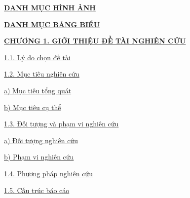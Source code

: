 \documentclass[12pt,a4paper]{article}
\begin{document}
{\small\linespread{0.84}\selectfont\setlength{\parskip}{0pt}
\noindent\hyperref[page:danh_muc_hinh]{\textbf{DANH MỤC HÌNH ẢNH} \dotfill \textbf{\pageref*{page:danh_muc_hinh}}}\par\vspace{1.5pt}
\noindent\hyperref[page:danh_muc_bang]{\textbf{DANH MỤC BẢNG BIỂU} \dotfill \textbf{\pageref*{page:danh_muc_bang}}}\par\vspace{3pt}

\noindent\hyperref[sec:chuong1]{\textbf{CHƯƠNG 1. GIỚI THIỆU ĐỀ TÀI NGHIÊN CỨU} \dotfill \textbf{\pageref*{sec:chuong1}}}\par
\hspace*{0.8cm}\hyperref[sec:ly_do_chon_de_tai]{1.1. Lý do chọn đề tài \dotfill \pageref*{sec:ly_do_chon_de_tai}}\par
\hspace*{0.8cm}\hyperref[sec:muc_tieu_nghien_cuu]{1.2. Mục tiêu nghiên cứu \dotfill \pageref*{sec:muc_tieu_nghien_cuu}}\par
\hspace*{1.6cm}\hyperref[sec:muc_tieu_tong_quat]{a) Mục tiêu tổng quát \dotfill \pageref*{sec:muc_tieu_tong_quat}}\par
\hspace*{1.6cm}\hyperref[sec:muc_tieu_cu_the]{b) Mục tiêu cụ thể \dotfill \pageref*{sec:muc_tieu_cu_the}}\par
\hspace*{0.8cm}\hyperref[sec:doi_tuong_pham_vi]{1.3. Đối tượng và phạm vi nghiên cứu \dotfill \pageref*{sec:doi_tuong_pham_vi}}\par
\hspace*{1.6cm}\hyperref[sec:doi_tuong_nghien_cuu]{a) Đối tượng nghiên cứu \dotfill \pageref*{sec:doi_tuong_nghien_cuu}}\par
\hspace*{1.6cm}\hyperref[sec:pham_vi_nghien_cuu]{b) Phạm vi nghiên cứu \dotfill \pageref*{sec:pham_vi_nghien_cuu}}\par
\hspace*{0.8cm}\hyperref[sec:phuong_phap_nghien_cuu]{1.4. Phương pháp nghiên cứu \dotfill \pageref*{sec:phuong_phap_nghien_cuu}}\par
\hspace*{0.8cm}\hyperref[sec:cau_truc_bao_cao]{1.5. Cấu trúc báo cáo \dotfill \pageref*{sec:cau_truc_bao_cao}}\par\vspace{2.5pt}

}
\end{document}
